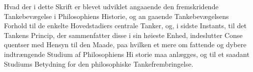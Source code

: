 Hvad der i dette Skrift er blevet udviklet angaaende den
fremskridende Tankebevægelse i Philosophiens Historie, og an\-%
gaaende Tankebevægelsens Forhold til de enkelte Hovedstadiers
centrale Tanker, og, i sidste Instants, til det Tankens Princip,
der sammenfatter disse i sin høieste Enhed, indeslutter Conse\-%
quentser med Hensyn til den Maade, paa hvilken et mere om\-%
fattende og dybere indtrængende Studium af Philosophiens Hi\-%
storie maa anlægges, og til et saadant Studiums Betydning
for den philosophiske Tankefrembringelse.

